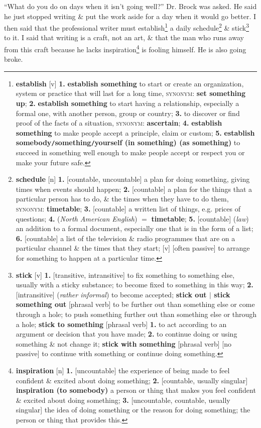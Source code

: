 \documentclass[oneside]{book}
\numberwithin{equation}{section}
\begin{document}
``What do you do on days when it isn't going well?'' Dr. Brock was asked. He said he just stopped writing \& put the work aside for a day when it would go better. I then said that the professional writer must establish\footnote{\textbf{establish} [v] \textbf{1.} \textbf{establish something} to start or create an organization, system or practice that will last for a long time, \textsc{synonym}: \textbf{set something up}; \textbf{2.} \textbf{establish something} to start having a relationship, especially a formal one, with another person, group or country; \textbf{3.} to discover or find proof of the facts of a situation, \textsc{synonym}: \textbf{ascertain}; \textbf{4.} \textbf{establish something} to make people accept a principle, claim or custom; \textbf{5.} \textbf{establish somebody\texttt{/}something\texttt{/}yourself (in something) (as something)} to succeed in something well enough to make people accept or respect you or make your future safe.} a daily schedule\footnote{\textbf{schedule} [n] \textbf{1.} [countable, uncountable] a plan for doing something, giving times when events should happen; \textbf{2.} [countable] a plan for the things that a particular person has to do, \& the times when they have to do them, \textsc{synonym}: \textbf{timetable}; \textbf{3.} [countable] a written list of things, e.g. prices of questions; \textbf{4.} (\textit{North American English}) $=$ \textbf{timetable}; \textbf{5.} [countable] (\textit{law}) an addition to a formal document, especially one that is in the form of a list; \textbf{6.} [countable] a list of the television \& radio programmes that are on a particular channel \& the times that they start; [v] [often passive] to arrange for something to happen at a particular time.} \& stick\footnote{\textbf{stick} [v] \textbf{1.} [transitive, intransitive] to fix something to something else, usually with a sticky substance; to become fixed to something in this way; \textbf{2.} [intransitive] (\textit{rather informal}) to become accepted; \textbf{stick out $|$ stick something out} [phrasal verb] to be further out than something else or come through a hole; to push something further out than something else or through a hole; \textbf{stick to something} [phrasal verb] \textbf{1.} to act according to an argument or decision that you have made; \textbf{2.} to continue doing or using something \& not change it; \textbf{stick with something} [phrasal verb] [no passive] to continue with something or continue doing something.} to it. I said that writing is a craft, not an art, \& that the man who runs away from this craft because he lacks inspiration\footnote{\textbf{inspiration} [n] \textbf{1.} [uncountable] the experience of being made to feel confident \& excited about doing something; \textbf{2.} [countable, usually singular] \textbf{inspiration (to somebody)} a person or thing that makes you feel confident \& excited about doing something; \textbf{3.} [uncountable, countable, usually singular] the idea of doing something or the reason for doing something; the person or thing that provides this.} is fooling himself. He is also going broke.
\end{document}
